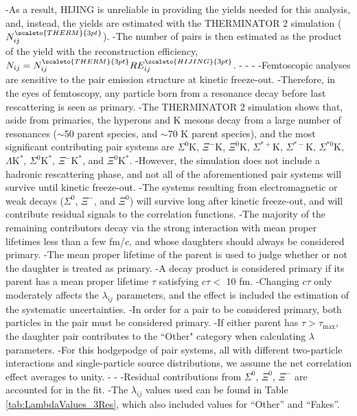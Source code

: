 -As a result, HIJING is unreliable in providing the yields needed for this analysis, and, instead, the yields are estimated with the THERMINATOR 2 simulation ($N_{ij}^{\scaleto{THERM}{3pt}}$).
-The number of \LamK pairs is then estimated as the product of the yield with the reconstruction efficiency, $N_{ij} = N_{ij}^{\scaleto{THERM}{3pt}}RE_{ij}^{\scaleto{HIJING}{3pt}}$.
-
-
-
-Femtoscopic analyses are sensitive to the pair emission structure at kinetic freeze-out.
-Therefore, in the eyes of femtoscopy, any particle born from a resonance decay before last rescattering is seen as primary.
-The THERMINATOR 2 simulation shows that, aside from primaries, the \Lam hyperons and K mesons decay from a large number of resonances ($\sim$50 \Lam parent species, and $\sim$70 K parent species), and the most significant contributing pair systems are $\Sigma^{0}$K, $\Xi^{-}$K, $\Xi^{0}$K, $\Sigma^{*+}$K, $\Sigma^{*-}$K, $\Sigma^{*0}$K, $\Lambda\mathrm{K}^{*}$, $\Sigma^{0}\mathrm{K}^{*}$, $\Xi^{-}\mathrm{K}^{*}$, and $\Xi^{0}\mathrm{K}^{*}$.
-However, the simulation does not include a hadronic rescattering phase, and not all of the aforementioned pair systems will survive until kinetic freeze-out.
-The systems resulting from electromagnetic or weak decays ($\Sigma^{0}$, $\Xi^{-}$, and $\Xi^{0}$) will survive long after kinetic freeze-out, and will contribute residual signals to the \LamK correlation functions.
-The majority of the remaining contributors decay via the strong interaction with mean proper lifetimes less than a few fm/$c$, and whose daughters should always be considered primary.
-The mean proper lifetime of the parent is used to judge whether or not the daughter is treated as primary.
-A decay product is considered primary if its parent has a mean proper lifetime $\tau$ satisfying $c\tau <$ 10 fm.
-Changing $c\tau$ only moderately affects the $\lambda_{ij}$ parameters, and the effect is included the estimation of the systematic uncertainties.
-In order for a pair to be considered primary, both particles in the pair must be considered primary. 
-If either parent has $\tau > \tau_{\mathrm{max}}$, the daughter pair contributes to the ``Other" category when calculating $\lambda$ parameters.
-For this hodgepodge of pair systems, all with different two-particle interactions and single-particle source distributions, we assume the net correlation effect averages to unity.
-
-
-Residual contributions from $\Sigma^{0}$, $\Xi^{0}$, $\Xi^{-}$ are accounted for in the fit.
-The $\lambda_{ij}$ values used can be found in Table \ref{tab:LambdaValues_3Res}, which also included values for ``Other'' and ``Fakes''.  
